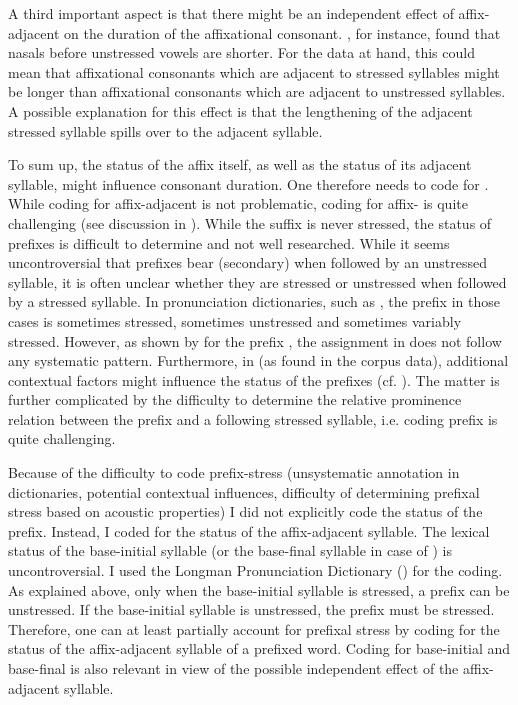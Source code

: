 A third important aspect is that there might be an independent effect of affix-adjacent  on the duration of the affixational consonant. \cite{Umeda.1977}, for instance, found that nasals before unstressed vowels are shorter. For the data at hand, this could mean that affixational consonants which are adjacent to stressed syllables might be longer than affixational consonants which are adjacent to unstressed syllables. A possible explanation for this effect is that the lengthening of the adjacent stressed syllable spills over to the adjacent syllable. 

To sum up, the  status of the affix itself, as well as the  status of its adjacent syllable, might influence consonant duration. One therefore needs to code for .
While coding for affix-adjacent  is not problematic, coding for affix- is quite challenging (see discussion in ). 
While the suffix  is never stressed, the  status of prefixes is difficult to determine and not well researched. While it seems uncontroversial that prefixes bear (secondary)  when followed by an unstressed syllable, it is often unclear whether they are stressed or unstressed when followed by a stressed syllable. In pronunciation dictionaries, such as \cite{Wells.2008}, the prefix in those cases is sometimes stressed, sometimes unstressed and sometimes variably stressed. However, as shown by \cite{Hanote.2010} for the prefix , the  assignment in \cite{Wells.2008} does not follow any systematic pattern. Furthermore, in  (as found in the corpus data), additional contextual factors might influence the  status of the prefixes (cf. \citealt{Videau.2015}). The matter is further complicated by the difficulty to determine the relative prominence relation between the prefix and a following stressed syllable, i.e. coding prefix  is quite challenging. 

Because of the difficulty to code prefix-stress (unsystematic annotation in dictionaries, potential contextual influences, difficulty of determining prefixal stress based on acoustic properties) I did not explicitly code the  status of the prefix.
 Instead, I coded for the  status of the affix-adjacent syllable. The lexical  status of the base-initial syllable (or the base-final syllable in case of ) is uncontroversial. I used the Longman Pronunciation Dictionary (\citealt{Wells.2008}) for the coding.
 As explained above, only when the base-initial syllable is stressed, a prefix can be unstressed. If the base-initial syllable is unstressed, the prefix must be stressed. Therefore, one can at least partially account for prefixal stress by coding for the  status of the affix-adjacent syllable of a prefixed word. 
 Coding for base-initial and base-final  is also relevant in view of the possible independent effect of the affix-adjacent syllable. 
 
